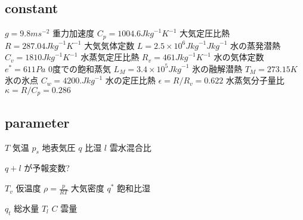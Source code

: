 \hypertarget{constant}{%
\subsection{constant}\label{constant}}

\(g = 9.8 m s^{-2}\) 重力加速度 \(C_p=1004.6 J {kg}^{-1} K^{-1}\)
大気定圧比熱 \(R=287.04 J {kg}^{-1} K^{-1}\) 大気気体定数
\(L=2.5 \times 10^{6} J {kg}^{-1} J {kg}^{-1}\) 水の蒸発潜熱
\(C_v=1810 J {kg}^{-1} K^{-1}\) 水蒸気定圧比熱
\(R_v=461 J {kg}^{-1} K^{-1}\) 水の気体定数 \(e^{*}=611Pa\)
0度での飽和蒸気 \(L_M=3.4\times 10^{5} J {kg}^{-1}\) 氷の融解潜熱
\(T_M=273.15 K\) 氷の氷点 \(C_w=4200. J {kg}^{-1}\) 水の定圧比熱
\(\epsilon=R / R_{v} = 0.622\) 水蒸気分子量比 \(\kappa=R / C_{p}=0.286\)

\hypertarget{parameter}{%
\subsection{parameter}\label{parameter}}

\(T\) 気温 \(p_s\) 地表気圧 \(q\) 比湿 \(l\) 雲水混合比

\(q + l\) が予報変数?

\(T_v\) 仮温度 \(\rho=\frac{p}{RT}\) 大気密度 \(q^{*}\) 飽和比湿

\(q_t\) 総水量 \(T_l\) \(C\) 雲量
